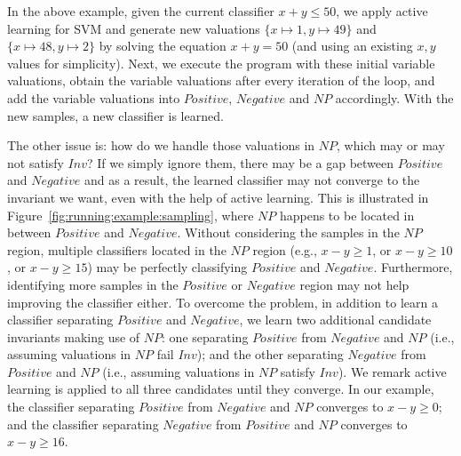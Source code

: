 \begin{example}
In the above example, given the current classifier $x+y \leq 50$, we apply active learning for SVM and generate new valuations $\{x \mapsto 1, y \mapsto 49\}$ and $\{x \mapsto 48, y \mapsto 2\}$ by solving the equation $x+y=50$ (and using an existing $x, y$ values for simplicity). Next, we execute the program with these initial variable valuations, obtain the variable valuations after every iteration of the loop, and add the variable valuations into $\mathit{Positive}$, $\mathit{Negative}$ and $\mathit{NP}$ accordingly. With the new samples, a new classifier is learned.
\end{example}
The other issue is: how do we handle those valuations in $\mathit{NP}$, which may or may not satisfy $\mathit{Inv}$? If we simply ignore them, there may be a gap between $\mathit{Positive}$ and $\mathit{Negative}$ and as a result, the learned classifier may not converge to the invariant we want, even with the help of active learning. This is illustrated in Figure~\ref{fig:running:example:sampling}, where $\mathit{NP}$ happens to be located in between $\mathit{Positive}$ and $\mathit{Negative}$. Without considering the samples in the $\mathit{NP}$ region, multiple classifiers located in the $\mathit{NP}$ region (e.g., $x - y \geq 1$, or $x - y \geq 10$, or $x - y \geq 15$) may be perfectly classifying $\mathit{Positive}$ and $\mathit{Negative}$. Furthermore, identifying more samples in the $\mathit{Positive}$ or $\mathit{Negative}$ region may not help improving the classifier either. To overcome the problem, in addition to learn a classifier separating $\mathit{Positive}$ and $\mathit{Negative}$, we learn two additional candidate invariants making use of $\mathit{NP}$: one separating $\mathit{Positive}$ from $\mathit{Negative}$ and $\mathit{NP}$ (i.e., assuming valuations in $\mathit{NP}$ fail $\mathit{Inv}$); and the other separating $\mathit{Negative}$ from $\mathit{Positive}$ and $\mathit{NP}$ (i.e., assuming valuations in $\mathit{NP}$ satisfy $\mathit{Inv}$). We remark active learning is applied to all three candidates until they converge. In our example, the classifier separating $\mathit{Positive}$ from $\mathit{Negative}$ and $\mathit{NP}$ converges to $x - y \geq 0$; and the classifier separating $\mathit{Negative}$ from $\mathit{Positive}$ and $\mathit{NP}$ converges to $x - y \geq 16$.

